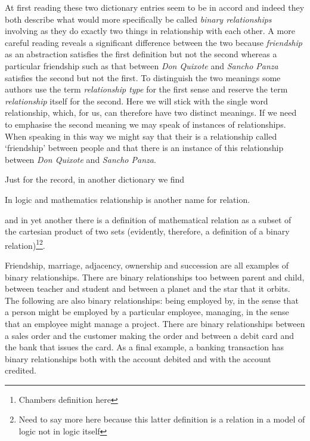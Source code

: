 At first reading these two dictionary entries seem to be in accord and indeed 
they both describe what would more specifically be called \textit{binary relationships} involving as they do exactly two things in relationship with each other.
A more careful reading reveals a significant difference between the two because \textit{friendship} as an abstraction satisfies the first definition but not the second whereas a particular friendship such as that between \textit{Don Quixote} and \textit{Sancho Panza} satisfies the second  but not the first. 
To distinguish the two meanings some authors use the term \textit{relationship type} for the first sense and reserve the term \textit{relationship} itself for the second. Here we will stick with the single word relationship, which, for us, can therefore have two distinct meanings. If we need to emphasise the second meaning we may speak of instances of relationships. When speaking in this way we might say that their is a relationship called `friendship' between people and that there is an instance of this relationship between \textit{Don Quixote} and \textit{Sancho Panza}.

\mynote
Just for the record, in another dictionary we find 
\begin{erquote}
In logic and mathematics relationship is another name for relation.
\end{erquote}
and in yet another there is a definition of mathematical relation as a subset of the cartesian product of two sets 
(evidently, therefore, a definition of a binary relation)\footnote{Chambers definition here}\footnote{Need to say more here because this latter definition is a relation in a model of logic not in logic itself}. 

\mynote
Friendship,  marriage, adjacency, ownership and succession are all examples of binary relationships. There are binary relationships too  between parent and child, between teacher and student and between a planet and the star that it orbits.   
The following are also binary relationships:
being employed by, in the sense that a person might be employed by a particular employee,
managing, in the sense that an employee might manage a project. 
There are binary relationships between a sales order and the customer making the order and between a debit card and  the bank that issues the card. As a final example, a banking transaction has binary relationships both with the account debited and with the account credited. 

